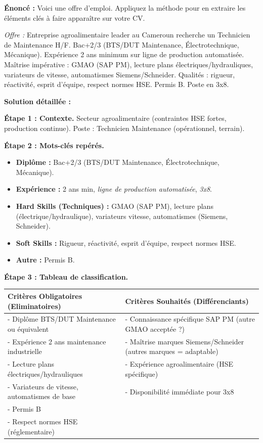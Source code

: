\documentclass[11pt]{article}
\begin{document}
\begin{exoresolu}
\textbf{Énoncé :} Voici une offre d'emploi. Appliquez la méthode pour en extraire les éléments clés à faire apparaître sur votre CV.

\emph{Offre :} \og Entreprise agroalimentaire leader au Cameroun recherche un Technicien de Maintenance H/F. Bac+2/3 (BTS/DUT Maintenance, Électrotechnique, Mécanique). Expérience 2 ans minimum sur ligne de production automatisée. Maîtrise impérative : GMAO (SAP PM), lecture plans électriques/hydrauliques, variateurs de vitesse, automatismes Siemens/Schneider. Qualités : rigueur, réactivité, esprit d'équipe, respect normes HSE. Permis B. Poste en 3x8. \fg

\tcblower
\textbf{Solution détaillée :}

\noindent \textbf{Étape 1 : Contexte.} Secteur agroalimentaire (contraintes HSE fortes, production continue). Poste : Technicien Maintenance (opérationnel, terrain).

\noindent \textbf{Étape 2 : Mots-clés repérés.}
\begin{itemize}
    \item \textbf{Diplôme :} Bac+2/3 (BTS/DUT Maintenance, Électrotechnique, Mécanique).
    \item \textbf{Expérience :} 2 ans min, \emph{ligne de production automatisée}, \emph{3x8}.
    \item \textbf{Hard Skills (Techniques) :} GMAO (SAP PM), lecture plans (électrique/hydraulique), variateurs vitesse, automatismes (Siemens, Schneider).
    \item \textbf{Soft Skills :} Rigueur, réactivité, esprit d'équipe, respect normes HSE.
    \item \textbf{Autre :} Permis B.
\end{itemize}

\noindent \textbf{Étape 3 : Tableau de classification.}

\begin{center}
\begin{tabularx}{\linewidth}{|X|X|}
\hline
\rowcolor{popblueL}
\textbf{Critères Obligatoires (Eliminatoires)} & \textbf{Critères Souhaités (Différenciants)} \\
\hline
- Diplôme BTS/DUT Maintenance ou équivalent & - Connaissance spécifique SAP PM (autre GMAO acceptée ?) \\
- Expérience 2 ans maintenance industrielle & - Maîtrise marques Siemens/Schneider (autres marques = adaptable) \\
- Lecture plans électriques/hydrauliques & - Expérience agroalimentaire (HSE spécifique) \\
- Variateurs de vitesse, automatismes de base & - Disponibilité immédiate pour 3x8 \\
- Permis B & \\
- Respect normes HSE (réglementaire) & \\
\hline
\end{tabularx}
\end{center}


\end{exoresolu}
\end{document}
